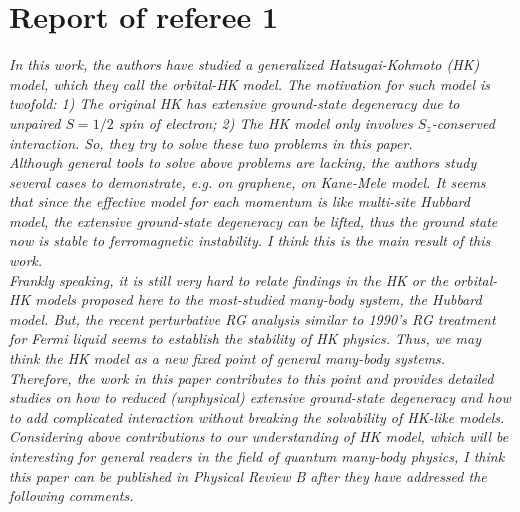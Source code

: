 \documentclass[aps,reprint,notitlepage,onecolumn,12pt]{revtex4-2}
\numberwithin{equation}{section}
\begin{document}
\section{Report of referee 1}

\textit{In this work, the authors have studied a generalized Hatsugai-Kohmoto (HK) model, which they call the orbital-HK model.
The motivation for such model is twofold: 1) The original HK has extensive ground-state
degeneracy due to unpaired $S=1/2$ spin of electron; 2) The HK model
only involves $S_z$-conserved interaction. 
So, they try to solve these two problems in this paper.}\\

\textit{Although general tools to solve above problems are lacking, the
authors study several cases to demonstrate, e.g. on graphene, on
Kane-Mele model.
It seems that since the effective model for each
momentum is like multi-site Hubbard model, the extensive ground-state
degeneracy can be lifted, thus the ground state now is stable to
ferromagnetic instability. 
I think this is the main result of this work.}\\

\textit{Frankly speaking, it is still very hard to relate findings in the HK
or the orbital-HK models proposed here to the most-studied many-body
system, the Hubbard model. 
But, the recent perturbative RG analysis similar to 1990’s RG treatment for Fermi liquid seems to establish the stability of HK physics. 
Thus, we may think the HK model as a new fixed point of general many-body systems.}\\

\textit{Therefore, the work in this paper contributes to this point and
provides detailed studies on how to reduced (unphysical) extensive ground-state degeneracy and how to add complicated interaction without
breaking the solvability of HK-like models. 
Considering above contributions to our understanding of HK model, which will be
interesting for general readers in the field of quantum many-body
physics, I think this paper can be published in Physical Review B
after they have addressed the following comments.}\\
\end{document}
